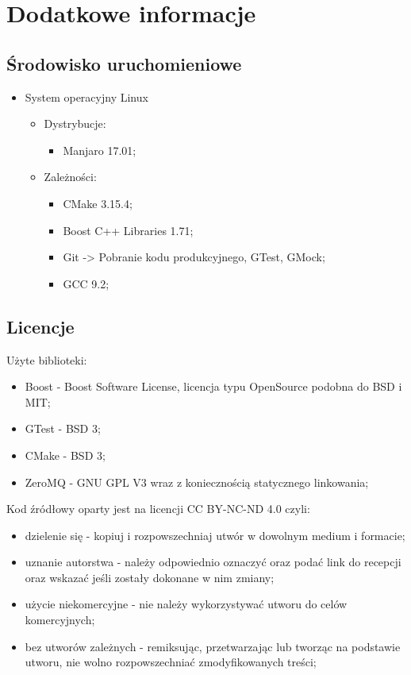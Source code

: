 \chapter{Dodatkowe informacje}
\section{Środowisko uruchomieniowe}
	\begin{itemize}
		\item System operacyjny Linux
			\begin{itemize}
				\item Dystrybucje:
				\begin{itemize}
					\item Manjaro 17.01;
				\end{itemize}
				\item Zależności:
					\begin{itemize}
						\item CMake 3.15.4;
						\item Boost C++ Libraries 1.71;
						\item Git -> Pobranie kodu produkcyjnego, GTest, GMock;
						\item GCC 9.2;
					\end{itemize}
			\end{itemize}
	\end{itemize}
\section{Licencje}
	\noindent
	Użyte biblioteki:
	\begin{itemize}
		\item Boost - Boost Software License, licencja typu OpenSource podobna do BSD i MIT;
		\item GTest - BSD 3;
		\item CMake - BSD 3;
		\item ZeroMQ - GNU GPL V3 wraz z koniecznością statycznego linkowania;
	\end{itemize}
	\bigskip
	Kod źródłowy oparty jest na licencji CC BY-NC-ND 4.0 \cite{CC} czyli:
	\begin{itemize}
		\item dzielenie się - kopiuj i rozpowszechniaj utwór w dowolnym medium i formacie;
		\item uznanie autorstwa - należy odpowiednio oznaczyć oraz podać link do recepcji oraz wskazać
		jeśli zostały dokonane w nim zmiany;
		\item użycie niekomercyjne - nie należy wykorzystywać utworu do celów komercyjnych;
		\item bez utworów zależnych - remiksując, przetwarzając lub tworząc na podstawie utworu,
		nie wolno rozpowszechniać zmodyfikowanych treści;
	\end{itemize}
